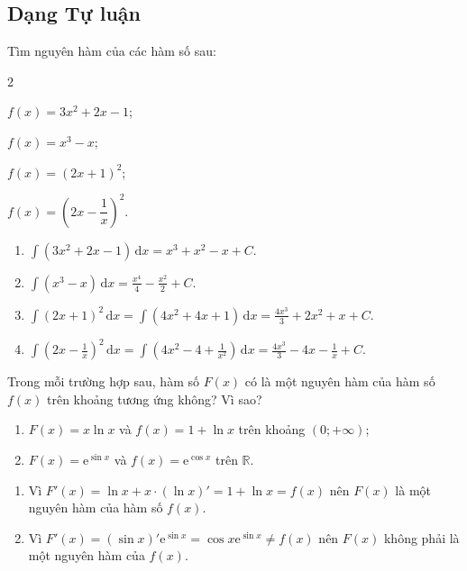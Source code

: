 \documentclass[12pt,aspectratio=169]{beamer}
\begin{document}
\subsection{Dạng Tự luận}

\begin{baitap}%
	Tìm nguyên hàm của các hàm số sau:
	\begin{enumEX}{2}
		\item $f(x) = 3x^2 + 2x - 1$;
		\item $f(x) = x^3-x$;
		\item $f(x) = (2x+1)^2$;
		\item $f(x) = \left(2x-\dfrac{1}{x}\right)^2$.
	\end{enumEX}

	\begin{loigiai}
		\begin{enumerate}
			\item $\displaystyle \int \left(3x^2 + 2x - 1\right) \mathrm{\,d}x = x^3 + x^2 - x + C.$

			\item $\displaystyle \int \left(x^3 - x\right) \mathrm{\,d}x = \frac{x^4}{4} - \frac{x^2}{2} + C.$

			\item $\displaystyle \int \left(2x+1\right)^2 \mathrm{\,d}x =\int (4x^2+4x+1) \mathrm{\,d}x= \frac{4x^3}{3} + 2x^2 + x + C.$

			\item $\displaystyle \int \left(2x-\frac{1}{x}\right)^2\mathrm{\,d}x =\int \left(4x^2-4+\frac{1}{x^2}\right)\mathrm{\,d}x = \frac{4x^3}{3} - 4x - \frac{1}{x} + C.$
		\end{enumerate}
	\end{loigiai}
\end{baitap}

\begin{baitap}%
	Trong mỗi trường hợp sau, hàm số $F(x)$ có là một nguyên hàm của hàm số $f(x)$ trên khoảng tương ứng không? Vì sao?
	\begin{enumerate}
		\item $F(x) = x\ln x$ và $f(x) = 1 + \ln x$ trên khoảng $(0;+\infty)$;
		\item $F(x) = \mathrm{e}^{\sin x}$ và $f(x) = \mathrm{e}^{\cos x}$ trên $\mathbb{R}$.
	\end{enumerate}

	\begin{loigiai}
		\begin{enumerate}
			\item Vì $F'(x)=\ln x+x\cdot \left(\ln x \right)'=1+\ln x=f(x)$ nên $F(x)$ là một nguyên hàm của hàm số $f(x)$.
			\item Vì $F'(x)=(\sin x)'\mathrm{e}^{\sin x}=\cos x\mathrm{e}^{\sin x}\ne f(x)$ nên $F(x)$ không phải là một nguyên hàm của $f(x)$.
		\end{enumerate}
	\end{loigiai}
\end{baitap}
\end{document}
